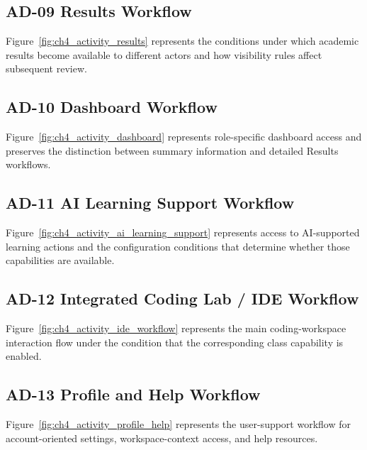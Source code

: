 \begin{samepage}
\subsection*{AD-09 Results Workflow}

Figure~\ref{fig:ch4_activity_results} represents the conditions under which
academic results become available to different actors and how visibility rules
affect subsequent review.
\end{samepage}

\begin{samepage}
\subsection*{AD-10 Dashboard Workflow}

Figure~\ref{fig:ch4_activity_dashboard} represents role-specific dashboard
access and preserves the distinction between summary information and detailed
Results workflows.
\end{samepage}

\begin{samepage}
\subsection*{AD-11 AI Learning Support Workflow}

Figure~\ref{fig:ch4_activity_ai_learning_support} represents access to
AI-supported learning actions and the configuration conditions that determine
whether those capabilities are available.
\end{samepage}

\begin{samepage}
\subsection*{AD-12 Integrated Coding Lab / IDE Workflow}

Figure~\ref{fig:ch4_activity_ide_workflow} represents the main coding-workspace
interaction flow under the condition that the corresponding class capability
is enabled.
\end{samepage}

\begin{samepage}
\subsection*{AD-13 Profile and Help Workflow}

Figure~\ref{fig:ch4_activity_profile_help} represents the user-support workflow
for account-oriented settings, workspace-context access, and help resources.
\end{samepage}

